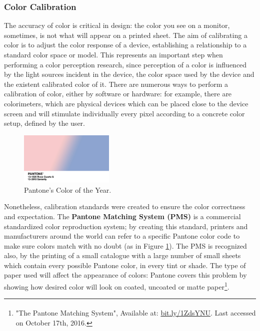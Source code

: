 \subsubsection{Color Calibration}
%
The accuracy of color is critical in design: the color you see on a monitor, sometimes, is not what will appear on a printed sheet. The aim of calibrating a color is to adjust the color response of a device, establishing
a relationship to a standard color space or model. This represents an important step when performing a
color perception research, since perception of a color is influenced by the light sources incident in the
device, the color space used by the device and the existent calibrated color of it. There are numerous
ways to perform a calibration of color, either by software or hardware: for example, there are colorimeters, which
are physical devices which can be placed close to the device screen and will stimulate individually every pixel
according to a concrete color setup, defined by the user. \par
%
\begin{figure}
	\centering
    \vspace{-10pt}
    \includegraphics[width=0.4\textwidth]{images/background/Pantone_rose_serenity.jpg}
    \caption[Pantone Matching System - Marsala]{Pantone's Color of the Year.\protect\footnotemark[16]}
    \label{fig:pantone}
\end{figure}
%
Nonetheless, calibration standards were created to ensure the color correctness and expectation. The
\textbf{Pantone Matching System (PMS)} is a commercial standardized color reproduction system; by creating
this standard, printers and manufacturers around the world can refer to a specific Pantone color code to
make sure colors match with no doubt (as in Figure \ref{fig:pantone}). The PMS is recognized also, by the printing of a small catalogue with
a large number of small sheets which contain every possible Pantone color, in every tint or shade. The type
of paper used will affect the appearance of colors: Pantone covers this problem by showing how desired
color will look on coated, uncoated or matte paper\footnote{"The Pantone Matching System\textsuperscript{\textregistered}",
Available at: \url {bit.ly/1ZdsYNU}. Last accessed on October 17th, 2016.}.

